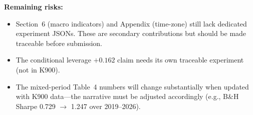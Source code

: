 \documentclass[12pt,a4paper]{article}
\begin{document}
\bigskip

\noindent\textbf{Remaining risks:}
\begin{itemize}[nosep]
\item Section~6 (macro indicators) and Appendix (time-zone) still lack dedicated experiment JSONs. These are secondary contributions but should be made traceable before submission.
\item The conditional leverage $+0.162$ claim needs its own traceable experiment (not in K900).
\item The mixed-period Table~4 numbers will change substantially when updated with K900 data---the narrative must be adjusted accordingly (e.g., B\&H Sharpe 0.729 $\to$ 1.247 over 2019--2026).
\end{itemize}
\end{document}
